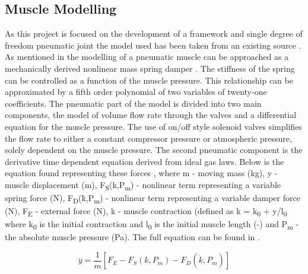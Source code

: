 \documentclass[11pt,a4paper]{article}
\begin{document}
\subsection{Muscle Modelling}
\label{sub:muscle_modelling}
As this project is focused on the development of a framework and single degree of freedom pneumatic joint the model used has been taken from an existing source \cite{hosovsky_2012}. As mentioned in  the modelling of a pneumatic muscle can be approached as a mechanically derived nonlinear mass spring damper . The stiffness of the spring can be controlled as a function of the muscle pressure. This relationship can be approximated by a fifth order polynomial of two variables of twenty-one coefficients. The pneumatic part of the model is divided into two main components, the model of volume flow rate through the valves and a differential equation for the muscle pressure. The use of on/off style solenoid valves simplifies the flow rate to either a constant compressor pressure or atmospheric pressure, solely dependent on the muscle pressure. The second pneumatic component is the derivative time dependent equation derived from ideal gas laws. Below is the equation found representing these forces , where m - moving mass (kg), y - muscle displacement (m), F\textsubscript{S}(k,P\textsubscript{m}) - nonlinear term representing a variable spring force (N), F\textsubscript{D}(\.{k},P\textsubscript{m}) - nonlinear term representing a variable damper force (N), F\textsubscript{E} - external force (N), k - muscle contraction (defined as k = k\textsubscript{0} + y/l\textsubscript{0} where k\textsubscript{0} is the initial contraction and l\textsubscript{0} is the initial muscle length (-) and P\textsubscript{m} - the absolute muscle pressure (Pa). The full equation can be found in .

\begin{equation}
    \ddot{y} = \frac{1}{m}[F_E-F_S(k,P_m)-F_D(\dot{k},P_m)]
    \label{math:dynamicforce2}
\end{equation}
\end{document}
